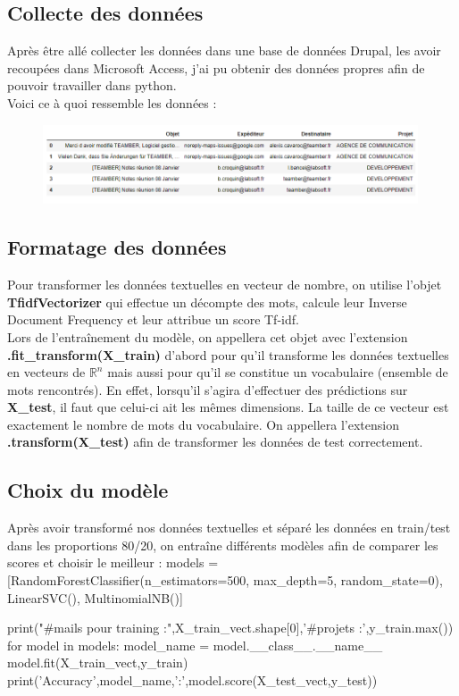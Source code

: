 \documentclass[12pt]{article}
\newenvironment{code}%
   {\snugshade\verbatim}%
   {\endverbatim\endsnugshade}
\begin{document}
\subsection{Collecte des données}

Après être allé collecter les données dans une base de données Drupal, les avoir recoupées dans Microsoft Access, j'ai pu obtenir des données propres afin de pouvoir travailler dans python.\\

Voici ce à quoi ressemble les données :
\begin{figure}[H]
\begin{center}
\includegraphics[width=0.99\textwidth]{donneesmail}
\end{center}
\end{figure}
\newpage
\subsection{Formatage des données}

Pour transformer les données textuelles en vecteur de nombre, on utilise l'objet \textbf{TfidfVectorizer }qui effectue un décompte des mots, calcule leur Inverse Document Frequency et leur attribue un score Tf-idf.\\

Lors de l'entraînement du modèle, on appellera cet objet avec l'extension \textbf{.fit\_transform(X\_train)} d'abord pour qu'il transforme les données textuelles en vecteurs de $\mathbb{R}^n$ mais aussi pour qu'il se constitue un vocabulaire (ensemble de mots rencontrés). En effet, lorsqu'il s'agira d'effectuer des prédictions sur \textbf{X\_test}, il faut que celui-ci ait les mêmes dimensions. La taille de ce vecteur est exactement le nombre de mots du vocabulaire. On appellera l'extension \textbf{.transform(X\_test)} afin de transformer les données de test correctement.


\subsection{Choix du modèle}
Après avoir transformé nos données textuelles et séparé les données en train/test dans les proportions 80/20, on entraîne différents modèles afin de comparer les scores et choisir le meilleur :
\begin{code}
models = [RandomForestClassifier(n_estimators=500, max_depth=5, random_state=0),
          LinearSVC(),
          MultinomialNB()]

print("#mails pour training :",X_train_vect.shape[0],'\n#projets :',y_train.max())
for model in models:
    model_name = model.__class__.__name__
    model.fit(X_train_vect,y_train)
    print('Accuracy',model_name,':',model.score(X_test_vect,y_test))
\end{code}
\end{document}
